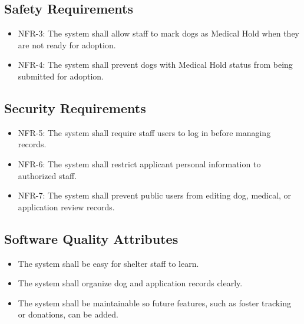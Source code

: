 \documentclass[12pt]{article}
\begin{document}
\subsection{Safety Requirements}
\begin{itemize}\item NFR-3: The system shall allow staff to mark dogs as Medical Hold when they are not ready for adoption.\end{itemize}
\begin{itemize}\item NFR-4: The system shall prevent dogs with Medical Hold status from being submitted for adoption.\end{itemize}
\subsection{Security Requirements}
\begin{itemize}\item NFR-5: The system shall require staff users to log in before managing records.\end{itemize}
\begin{itemize}\item NFR-6: The system shall restrict applicant personal information to authorized staff.\end{itemize}
\begin{itemize}\item NFR-7: The system shall prevent public users from editing dog, medical, or application review records.\end{itemize}
\subsection{Software Quality Attributes}
\begin{itemize}\item The system shall be easy for shelter staff to learn.\end{itemize}
\begin{itemize}\item The system shall organize dog and application records clearly.\end{itemize}
\begin{itemize}\item The system shall be maintainable so future features, such as foster tracking or donations, can be added.\end{itemize}
\end{document}
